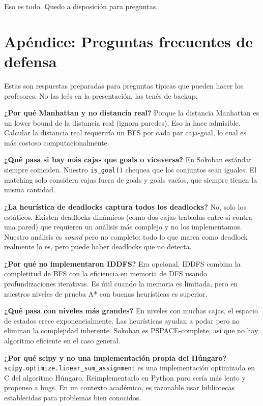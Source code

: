 \documentclass[12pt, a4paper]{article}
\begin{document}
Eso es todo. Quedo a disposición para preguntas.

\section*{Apéndice: Preguntas frecuentes de defensa}

\begin{notapresentador}
Estas son respuestas preparadas para preguntas típicas que pueden hacer los profesores. No las leés en la presentación, las tenés de backup.
\end{notapresentador}

\textbf{¿Por qué Manhattan y no distancia real?}
Porque la distancia Manhattan es un lower bound de la distancia real (ignora paredes). Eso la hace admisible. Calcular la distancia real requeriría un BFS por cada par caja-goal, lo cual es más costoso computacionalmente.

\textbf{¿Qué pasa si hay más cajas que goals o viceversa?}
En Sokoban estándar siempre coinciden. Nuestro \texttt{is\_goal()} chequea que los conjuntos sean iguales. El matching solo considera cajas fuera de goals y goals vacíos, que siempre tienen la misma cantidad.

\textbf{¿La heurística de deadlocks captura todos los deadlocks?}
No, solo los estáticos. Existen deadlocks dinámicos (como dos cajas trabadas entre sí contra una pared) que requieren un análisis más complejo y no los implementamos. Nuestro análisis es \textit{sound} pero no completo: todo lo que marca como deadlock realmente lo es, pero puede haber deadlocks que no detecta.

\textbf{¿Por qué no implementaron IDDFS?}
Era opcional. IDDFS combina la completitud de BFS con la eficiencia en memoria de DFS usando profundizaciones iterativas. Es útil cuando la memoria es limitada, pero en nuestros niveles de prueba A* con buenas heurísticas es superior.

\textbf{¿Qué pasa con niveles más grandes?}
En niveles con muchas cajas, el espacio de estados crece exponencialmente. Las heurísticas ayudan a podar pero no eliminan la complejidad inherente. Sokoban es PSPACE-complete, así que no hay algoritmo eficiente en el caso general.

\textbf{¿Por qué scipy y no una implementación propia del Húngaro?}
\texttt{scipy.optimize.linear\_sum\_assignment} es una implementación optimizada en C del algoritmo Húngaro. Reimplementarlo en Python puro sería más lento y propenso a bugs. En un contexto académico, es razonable usar bibliotecas establecidas para problemas bien conocidos.
\end{document}
